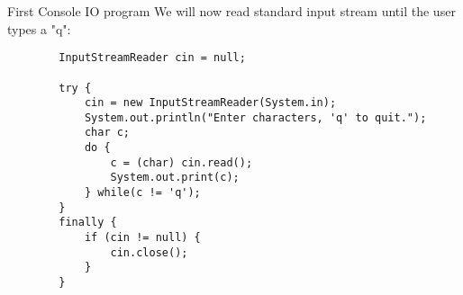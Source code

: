 \begin{frame}[fragile]{First Console IO program}
	We will now read standard input stream until the user types a "q":\\
	\begin{lstlisting}
		InputStreamReader cin = null;
		
		try {
			cin = new InputStreamReader(System.in);
			System.out.println("Enter characters, 'q' to quit.");
			char c;
			do {
				c = (char) cin.read();
				System.out.print(c);
			} while(c != 'q');
		}
		finally {
			if (cin != null) {
				cin.close();
			}
		}
	\end{lstlisting}
\end{frame}

